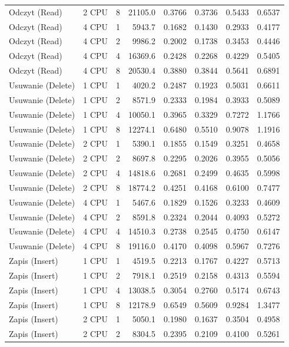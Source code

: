 \begin{table}[ht]
{\begin{tabular}{llcrrrrr}
Odczyt (Read) & 2 CPU & 8 & 21105.0 & 0.3766 & 0.3736 & 0.5433 & 0.6537 \\
Odczyt (Read) & 4 CPU & 1 & 5943.7 & 0.1682 & 0.1430 & 0.2933 & 0.4177 \\
Odczyt (Read) & 4 CPU & 2 & 9986.2 & 0.2002 & 0.1738 & 0.3453 & 0.4446 \\
Odczyt (Read) & 4 CPU & 4 & 16369.6 & 0.2428 & 0.2268 & 0.4229 & 0.5405 \\
Odczyt (Read) & 4 CPU & 8 & 20530.4 & 0.3880 & 0.3844 & 0.5641 & 0.6891 \\
Usuwanie (Delete) & 1 CPU & 1 & 4020.2 & 0.2487 & 0.1923 & 0.5031 & 0.6611 \\
Usuwanie (Delete) & 1 CPU & 2 & 8571.9 & 0.2333 & 0.1984 & 0.3933 & 0.5089 \\
Usuwanie (Delete) & 1 CPU & 4 & 10050.1 & 0.3965 & 0.3329 & 0.7272 & 1.1766 \\
Usuwanie (Delete) & 1 CPU & 8 & 12274.1 & 0.6480 & 0.5510 & 0.9078 & 1.1916 \\
Usuwanie (Delete) & 2 CPU & 1 & 5390.1 & 0.1855 & 0.1549 & 0.3251 & 0.4658 \\
Usuwanie (Delete) & 2 CPU & 2 & 8697.8 & 0.2295 & 0.2026 & 0.3955 & 0.5056 \\
Usuwanie (Delete) & 2 CPU & 4 & 14818.6 & 0.2681 & 0.2499 & 0.4635 & 0.5998 \\
Usuwanie (Delete) & 2 CPU & 8 & 18774.2 & 0.4251 & 0.4168 & 0.6100 & 0.7477 \\
Usuwanie (Delete) & 4 CPU & 1 & 5467.6 & 0.1829 & 0.1526 & 0.3233 & 0.4609 \\
Usuwanie (Delete) & 4 CPU & 2 & 8591.8 & 0.2324 & 0.2044 & 0.4093 & 0.5272 \\
Usuwanie (Delete) & 4 CPU & 4 & 14510.3 & 0.2738 & 0.2545 & 0.4750 & 0.6147 \\
Usuwanie (Delete) & 4 CPU & 8 & 19116.0 & 0.4170 & 0.4098 & 0.5967 & 0.7276 \\
Zapis (Insert) & 1 CPU & 1 & 4519.5 & 0.2213 & 0.1767 & 0.4227 & 0.5713 \\
Zapis (Insert) & 1 CPU & 2 & 7918.1 & 0.2519 & 0.2158 & 0.4313 & 0.5594 \\
Zapis (Insert) & 1 CPU & 4 & 13038.5 & 0.3054 & 0.2760 & 0.5174 & 0.6743 \\
Zapis (Insert) & 1 CPU & 8 & 12178.9 & 0.6549 & 0.5609 & 0.9284 & 1.3477 \\
Zapis (Insert) & 2 CPU & 1 & 5050.1 & 0.1980 & 0.1637 & 0.3504 & 0.4958 \\
Zapis (Insert) & 2 CPU & 2 & 8304.5 & 0.2395 & 0.2109 & 0.4100 & 0.5261 \\

\end{tabular}}
\end{table}

